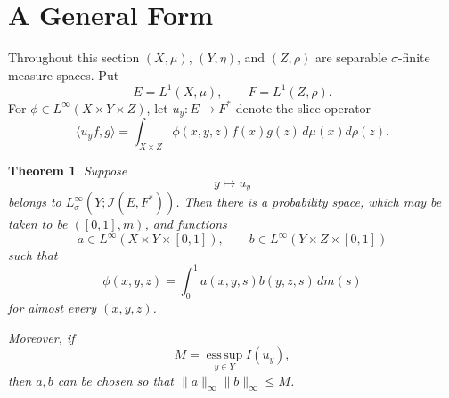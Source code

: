 \documentclass[11pt]{article}
\newtheorem{theorem}{Theorem}
\newcommand{\I}{\mathcal I}
\newcommand{\sig}{\sigma}
\begin{document}
\section*{A General Form}

Throughout this section \((X,\mu)\), \((Y,\eta)\), and \((Z,\rho)\) are
separable \(\sigma\)-finite measure spaces.  Put
\[
E=L^1(X,\mu),\qquad F=L^1(Z,\rho).
\]
For \(\phi\in L^\infty(X\times Y\times Z)\), let \(u_y:E\to F^*\) denote the
slice operator
\[
\langle u_y f,g\rangle
=\int_{X\times Z}\phi(x,y,z)f(x)g(z)\,d\mu(x)d\rho(z).
\]

\begin{theorem}\label{main}
Suppose
\[
y\longmapsto u_y
\]
belongs to \(L^\infty_\sig(Y;\I(E,F^*))\).  Then there is a probability space,
which may be taken to be \(([0,1],m)\), and functions
\[
a\in L^\infty(X\times Y\times[0,1]),\qquad
b\in L^\infty(Y\times Z\times[0,1])
\]
such that
\[
\phi(x,y,z)=\int_0^1 a(x,y,s)b(y,z,s)\,dm(s)
\]
for almost every \((x,y,z)\).

Moreover, if
\[
M=\operatorname*{ess\,sup}_{y\in Y} I(u_y),
\]
then \(a,b\) can be chosen so that
\(\|a\|_\infty\|b\|_\infty\le M\).
\end{theorem}
\end{document}

